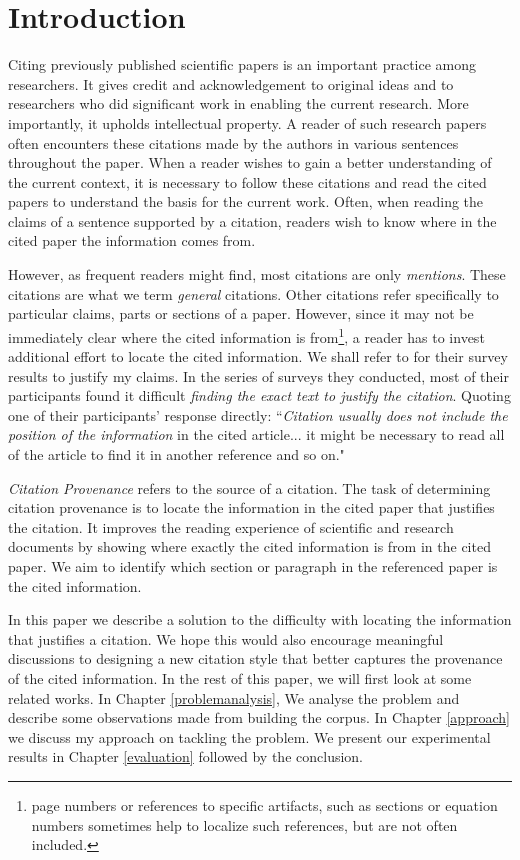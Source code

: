 \chapter{Introduction}
\label{introduction}
Citing previously published scientific papers is an important practice among researchers. It gives credit and acknowledgement to original ideas and to researchers who did significant work in enabling the current research.  More importantly, it upholds intellectual property. A reader of such research papers often encounters these citations made by the authors in various sentences throughout the paper. When a reader wishes to gain a better understanding of the current context, it is necessary to follow these citations and read the cited papers to understand the basis for the current work.  Often, when reading the claims of a sentence supported by a citation, readers wish to know where in the cited paper the information comes from.  

However, as frequent readers might find, most citations are only \textit{mentions}. These citations are what we term {\it general} citations. Other citations refer specifically to particular claims, parts or sections of a paper.   However, since it may not be immediately clear where the cited information is from\footnote{page numbers or references to specific artifacts, such as sections or equation numbers sometimes help to localize such references, but are not often included.}, a reader has to invest additional effort to locate the cited information. We shall refer to \cite{citation-sensitive} for their survey results to justify my claims. In the series of surveys they conducted, most of their participants found it difficult \textit{finding the exact text to justify the citation}. Quoting one of their participants' response directly: ``\textit{Citation usually does not include the position of the information} in the cited article... it might be necessary to read all of the article to find it in another reference and so on." \cite{citation-sensitive}

{\it Citation Provenance} refers to the source of a citation. The task of determining citation provenance is to locate the information in the cited paper that justifies the citation. It improves the reading experience of scientific and research documents by showing where exactly the cited information is from in the cited paper. We aim to identify which section or paragraph in the referenced paper is the cited information. 

In this paper we describe a solution to the difficulty with locating the information that justifies a citation. We hope this would also encourage meaningful discussions to designing a new citation style that better captures the provenance of the cited information. In the rest of this paper, we will first look at some related works. In Chapter \ref{problemanalysis}, We analyse the problem and describe some observations made from building the corpus. In Chapter \ref{approach} we discuss my approach on tackling the problem. We present our experimental results in Chapter \ref{evaluation} followed by the conclusion.